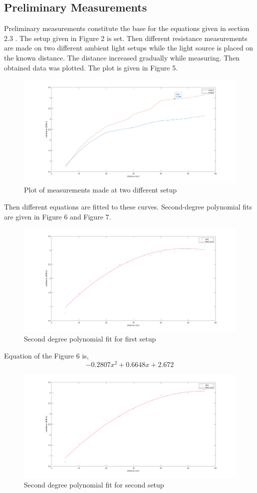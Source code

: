 \documentclass[letterpaper,12pt]{article}
\begin{document}
\subsection{Preliminary Measurements}
Preliminary measurements constitute the base for the equations given in section 2.3 . The setup given in Figure 2 is set. Then different resistance measurements are made on two different ambient light setups while the light source is placed on the known distance. The distance increased gradually while measuring. Then obtained data was plotted. The plot is given in Figure 5.
\begin{figure}[H]
	\centering
   \includegraphics[width=1\textwidth]{figure5.png}
   \caption{Plot of measurements made at two different setup}
\end{figure} 
Then different equations are fitted to these curves. Second-degree polynomial fits are given in Figure 6 and Figure 7.
\begin{figure}[H]
	\centering
   \includegraphics[width=1\textwidth]{2open_fit.png}
   \caption{Second degree polynomial fit for first setup}
\end{figure} 
Equation of the Figure 6 is,
\[-0.2807 x^2 + 0.6648x + 2.672\]
\begin{figure}[H]
	\centering
   \includegraphics[width=1\textwidth]{2closed_fit.png}
   \caption{Second degree polynomial fit for second setup}
\end{figure} 
\end{document}

